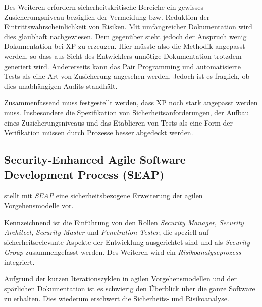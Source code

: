 Des Weiteren erfordern sicherheitskritische Bereiche ein gewisses Zusicherungsniveau bezüglich der Vermeidung bzw. Reduktion der Eintrittswahrscheinlichkeit von Risiken.
Mit umfangreicher Dokumentation wird dies glaubhaft nachgewiesen.
Dem gegenüber steht jedoch der Anspruch wenig Dokumentation bei XP zu erzeugen.
Hier müsste also die Methodik angepasst werden, so dass aus Sicht des Entwicklers unnötige Dokumentation trotzdem generiert wird.
Andererseits kann das Pair Programming und automatisierte Tests als eine Art von Zusicherung angesehen werden.
Jedoch ist es fraglich, ob dies unabhängigen Audits standhält.
\parencite[Vgl.][S. 8 f.]{Wayrynen:2004aa}

Zusammenfassend muss festgestellt werden, dass XP noch stark angepasst werden muss.
Insbesondere die Spezifikation von Sicherheitsanforderungen, der Aufbau eines Zusicherungsniveaus und das Etablieren von Tests als eine Form der Verifikation müssen durch Prozesse besser abgedeckt werden.

\subsection{Security-Enhanced Agile Software Development Process (SEAP)} \label{sec:seap}

\parencite[][]{Baca:2015aa} stellt mit \emph{SEAP} eine sicherheitsbezogene Erweiterung der agilen Vorgehensmodelle vor.

Kennzeichnend ist die Einführung von den Rollen \emph{Security Manager}, \emph{Security Architect}, \emph{Security Master} und \emph{Penetration Tester}, die speziell auf sicherheitsrelevante Aspekte der Entwicklung ausgerichtet sind und als \emph{Security Group} zusammengefasst werden.
Des Weiteren wird ein \emph{Risikoanalyseprozess} integriert.
\parencite[Vgl.][S. 14]{Baca:2015aa}

Aufgrund der kurzen Iterationszyklen in agilen Vorgehensmodellen und der spärlichen Dokumentation ist es schwierig den Überblick über die ganze Software zu erhalten.
Dies wiederum erschwert die Sicherheits- und Risikoanalyse.

